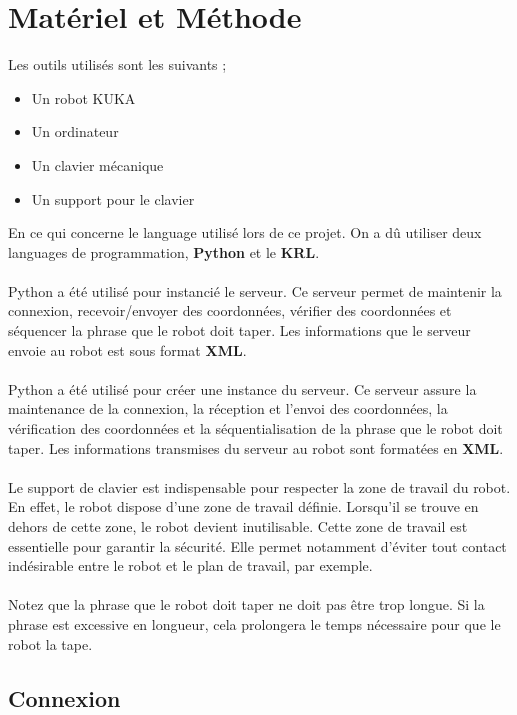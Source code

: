 \section{Matériel et Méthode}

Les outils utilisés sont les suivants ;

\begin{itemize}
    \item Un robot KUKA
    \item Un ordinateur
    \item Un clavier mécanique
    \item Un support pour le clavier
\end{itemize}

En ce qui concerne le language utilisé lors de ce projet.
On a dû utiliser deux languages de programmation, \textbf{Python} et le \textbf{KRL}.
\\
\\
Python a été utilisé pour instancié le serveur.
Ce serveur permet de maintenir la connexion, recevoir/envoyer des coordonnées, vérifier des coordonnées et séquencer la phrase que le robot doit taper.
Les informations que le serveur envoie au robot est sous format \textbf{XML}.
\\
\\
Python a été utilisé pour créer une instance du serveur.
Ce serveur assure la maintenance de la connexion, la réception et l'envoi des coordonnées, la vérification des coordonnées et la séquentialisation de la phrase que le robot doit taper.
Les informations transmises du serveur au robot sont formatées en \textbf{XML}.
\\
\\
Le support de clavier est indispensable pour respecter la zone de travail du robot.
En effet, le robot dispose d'une zone de travail définie.
Lorsqu'il se trouve en dehors de cette zone, le robot devient inutilisable.
Cette zone de travail est essentielle pour garantir la sécurité.
Elle permet notamment d'éviter tout contact indésirable entre le robot et le plan de travail, par exemple.
\\
\\
Notez que la phrase que le robot doit taper ne doit pas être trop longue.
Si la phrase est excessive en longueur, cela prolongera le temps nécessaire pour que le robot la tape.

\subsection{Connexion}

